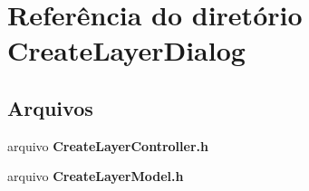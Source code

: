 \section{Referência do diretório Create\+Layer\+Dialog}
\label{dir_f809ffb84761b226b51de36b2bc901cd}
\subsection*{Arquivos}
\begin{DoxyCompactItemize}
\item 
arquivo {\bf Create\+Layer\+Controller.\+h}
\item 
arquivo {\bf Create\+Layer\+Model.\+h}
\end{DoxyCompactItemize}
